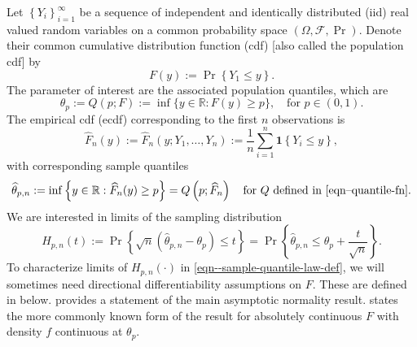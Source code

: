 Let \(\left\{ Y_{i} \right\}_{i = 1}^{\infty}\) be a sequence of independent and
identically distributed (iid) real valued random variables on a common
probability space \((\Omega, \mathscr{F}, \Pr)\).
Denote their common cumulative distribution function (cdf) [also called the
population cdf] by
\begin{equation*}
  F (y) := \Pr \left\{ Y_{1} \leq y \right\}.
\end{equation*}
The parameter of interest are the associated population quantiles, which are
\begin{equation}
  \theta_{p} := Q (p; F) := \inf \{y \in \mathbb{R} : F (y) \geq p\},
  \quad \text{for } p \in (0, 1).
  \label{eqn--quantile-fn}
\end{equation}
The empirical cdf (ecdf) corresponding to the first \(n\) observations is
\begin{equation*}
  \widehat{F}_{n} (y) := \widehat{F}_{n} \left( y; Y_{1}, \dots, Y_{n} \right)
  := \frac{1}{n} \sum_{i = 1}^{n} \mathbf{1} \left\{ Y_{i} \leq y \right\},
\end{equation*}
with corresponding sample quantiles
\begin{equation}
  \widehat{\theta}_{p, n} := \inf \left\{ y \in \mathbb{R} : \widehat{F}_{n}
  (y) \geq p \right\} = Q \left( p; \widehat{F}_{n} \right) \quad \text{for } Q
  \text{ defined in \eqref{eqn--quantile-fn}.}
  \label{eqn--sample-quantile-def}
\end{equation}
We are interested in limits of the sampling distribution
\begin{equation}
  H_{p, n} (t) := \Pr \left\{ \sqrt{n} \left( \widehat{\theta}_{p, n} -
  \theta_{p} \right) \leq t \right\} = \Pr \left\{ \widehat{\theta}_{p, n} \leq
  \theta_{p} + \frac{t}{\sqrt{n}} \right\}.
  \label{eqn--sample-quantile-law-def}
\end{equation}
To characterize limits of \(H_{p, n} (\cdot)\) in
\eqref{eqn--sample-quantile-law-def}, we will sometimes need directional
differentiability assumptions on \(F\).
These are defined in  below.
 provides a statement of the main
asymptotic normality result.
 states the more commonly known form of the result for
absolutely continuous \(F\) with density \(f\) continuous at \(\theta_{p}\).


